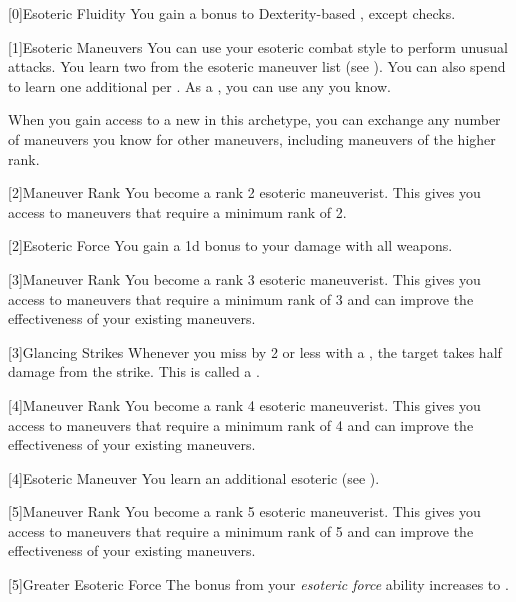         [0]{Esoteric Fluidity} You gain a  bonus to Dexterity-based , except  checks.

        {
            [1]{Esoteric Maneuvers}
            You can use your esoteric combat style to perform unusual attacks.
            You learn two  from the esoteric maneuver list (see ).
            You can also spend  to learn one additional  per .
            As a , you can use any  you know.

            When you gain access to a new  in this archetype,
                you can exchange any number of maneuvers you know for other maneuvers,
                including maneuvers of the higher rank.
        }

        {
            [2]{Maneuver Rank} You become a rank 2 esoteric maneuverist.
            This gives you access to maneuvers that require a minimum rank of 2.

            [2]{Esoteric Force} You gain a \plus1d bonus to your damage with all weapons.
        }

        {
            [3]{Maneuver Rank} You become a rank 3 esoteric maneuverist.
            This gives you access to maneuvers that require a minimum rank of 3 and can improve the effectiveness of your existing maneuvers.

            [3]{Glancing Strikes} Whenever you miss by 2 or less with a , the target takes half damage from the strike.
            This is called a .
        }

        {
            [4]{Maneuver Rank} You become a rank 4 esoteric maneuverist.
            This gives you access to maneuvers that require a minimum rank of 4 and can improve the effectiveness of your existing maneuvers.

            [4]{Esoteric Maneuver}
            You learn an additional esoteric  (see ).
        }

        {
            [5]{Maneuver Rank} You become a rank 5 esoteric maneuverist.
            This gives you access to maneuvers that require a minimum rank of 5 and can improve the effectiveness of your existing maneuvers.

            [5]{Greater Esoteric Force} The bonus from your \textit{esoteric force} ability increases to .
        }

